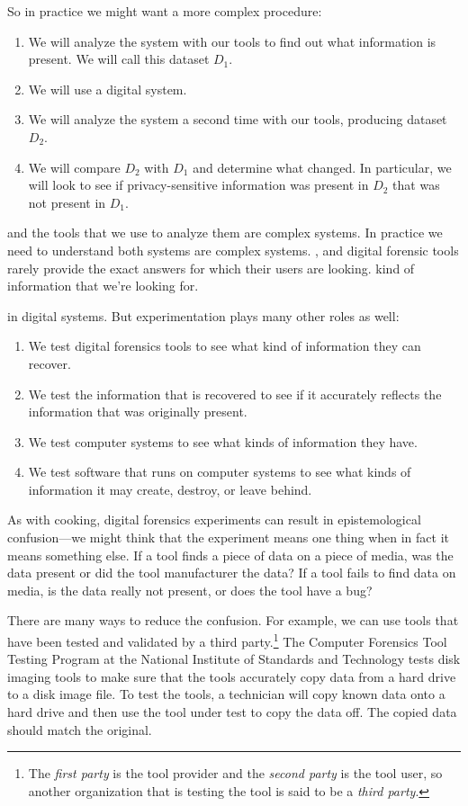 So in practice we might want a more complex procedure:

\begin{enumerate}
\item We will analyze the system with our tools to find out what
  information is present. We will call this dataset $D_1$. 
\item We will use a digital system.
\item We will analyze the system a second time with our tools,
  producing dataset $D_2$. 
\item We will compare $D_2$ with $D_1$ and determine what changed. In
  particular, we will look to see if privacy-sensitive information was
  present in $D_2$ that was not present in $D_1$. 
\end{enumerate}



and
the tools that we use to analyze them are complex systems. In practice
we need to understand both systems are
complex systems. , and digital forensic tools rarely provide the
exact answers for which their users are looking. kind of information that we're looking for. 

in
digital systems. But experimentation plays many other roles as well:



\begin{enumerate}
\item We test digital forensics tools to see what kind of information they can recover.
\item We test the information that is recovered to see if it
  accurately reflects the information that was originally present.
\item We test computer systems to see what kinds of information they have.
\item We test software that runs on computer systems to see what kinds
  of information it may create, destroy, or leave behind.
\end{enumerate}

As with cooking, digital forensics experiments can result in epistemological
confusion---we might think that the experiment means one thing when in
fact it means something else. If a tool finds a piece of data on a piece of media, was
the data present or did the tool manufacturer the data? If a tool
fails to find data on media, is the data really not present, or does
the tool have a bug?

There are many ways to reduce the confusion. For example, we can use
tools that have been
tested and validated by a third party.\footnote{The \emph{first party}
  is the tool provider and the \emph{second party} is the tool user,
  so another organization that is testing the tool is said to be a
  \emph{third party}.} The Computer Forensics Tool
Testing Program at the National Institute of
Standards and Technology tests disk imaging tools to make sure that
the tools accurately copy data from a hard drive to a disk image
file. To test the tools, a technician will copy known data onto a hard
drive and then use the tool under test to copy the data off. The copied data
should match the original.


